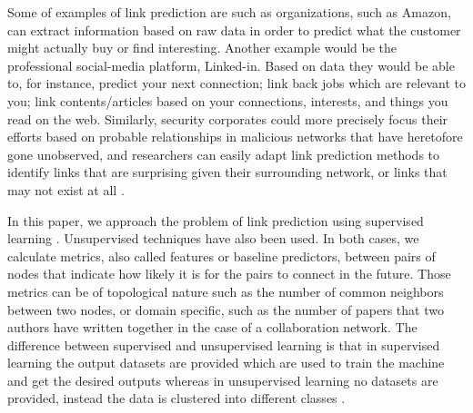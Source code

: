 \documentclass{acm_proc_article-sp}
\begin{document}
Some of examples of link prediction are such as organizations, such as Amazon, can extract information based on raw data in order to predict what the customer might actually buy or find interesting. Another example would be the professional social-media platform, Linked-in.  Based on data they would be able to, for instance, predict your next connection; link back jobs which are relevant to you; link contents/articles based on your connections, interests, and things you read on the web. Similarly, security corporates could more precisely focus their efforts based on probable relationships in malicious networks that have heretofore gone unobserved, and researchers can easily adapt link prediction methods to identify links that are surprising given their surrounding network, or links that may not exist at all \cite{Lichtenwalter:2010:NPM:1835804.1835837}. 



In this paper, we approach the problem of link prediction using supervised learning \cite{Fire2013, Hasan06linkprediction, Lichtenwalter:2010:NPM:1835804.1835837, Wang:2007:LPM:1441428.1442084}. Unsupervised techniques have also been used. In both cases, we calculate metrics, also called features or baseline predictors, between pairs of nodes that indicate how likely it is for the pairs to connect in the future. Those metrics can be of topological nature such as the number of common neighbors between two nodes, or domain specific, such as the number of papers that two authors have written together in the case of a collaboration network. The difference between supervised and unsupervised learning is that in supervised learning the output datasets are provided which are used to train the machine and get the desired outputs whereas in unsupervised learning no datasets are provided, instead the data is clustered into different classes . 

\end{document}
